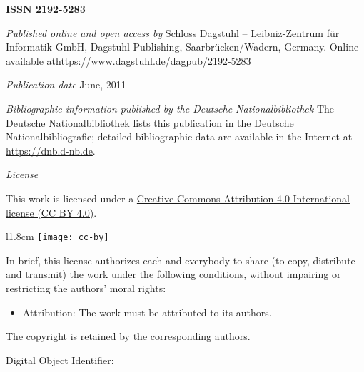 \documentclass[a4paper,USenglish]{dagrep-master-v2021}
\begin{document}
\begin{publicationinfo}%
\sffamily
\twocolumn



{\Large\bf\sffamily \textbf{\href{http://www.dagstuhl.de/dagrep}{ISSN 2192-5283}}}

\bigskip
\bigskip

\emph{Published online and open access by}\newline 
Schloss Dagstuhl -- Leibniz-Zentrum f\"ur Informatik GmbH, Dagstuhl
Publishing, Saarbr\"ucken/Wadern, Germany.  Online available at\newline \href{https://www.dagstuhl.de/dagpub/2192-5283}{https://www.dagstuhl.de/dagpub/2192-5283}

\bigskip
\emph{Publication date}\newline
June, 2011

\bigskip
\emph{Bibliographic information published by the Deutsche
  Nationalbibliothek}\newline 
The Deutsche Nationalbibliothek lists this publication in the Deutsche
Nationalbibliografie; detailed bibliographic data are available in the
Internet at \url{https://dnb.d-nb.de}.

\bigskip
\emph{License}

This work is licensed under a \href{https://creativecommons.org/licenses/by/4.0/de/legalcode}{Creative Commons
Attribution 4.0 International license (CC BY 4.0)}.

\begin{wrapfigure}[2]{l}{1.8cm}
\vspace*{-1\baselineskip}
\texttt{[image: cc-by]}
\end{wrapfigure} 
In brief, this license authorizes each and everybody to share (to
copy, distribute and transmit) the work under the following
conditions, without impairing or restricting the authors'
moral rights:
\begin{itemize}
\item Attribution: The work must be attributed to its authors.
\end{itemize}

\smallskip

The copyright is retained by the corresponding authors.

\vfill

Digital Object Identifier: \printDOI

\newpage



\end{publicationinfo}
\end{document}
